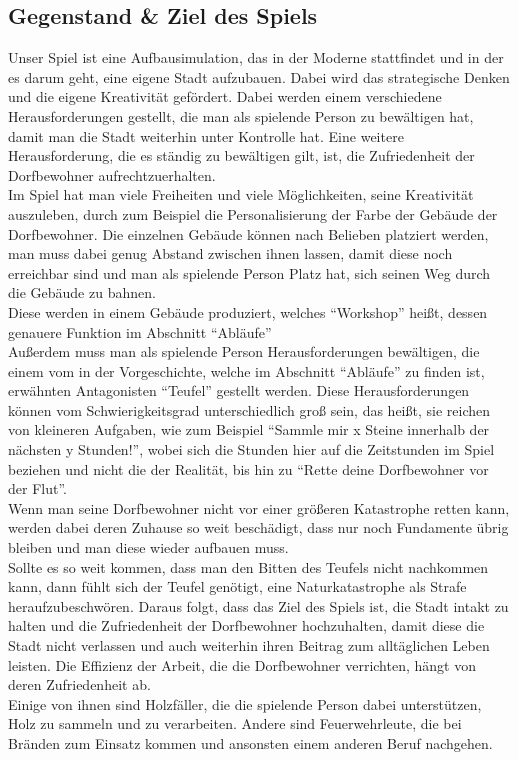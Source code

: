 \documentclass[paper=A4,pagesize=auto,12pt,headinclude=true,footinclude=true,BCOR=0mm,DIV=calc]{scrartcl}
\newcommand{\sectionspace}{
	\vspace{0.5cm}
}
\begin{document}
\sectionspace
\subsection{Gegenstand \& Ziel des Spiels}\label{sec:Gegenstand}
Unser Spiel ist eine Aufbausimulation, das in der Moderne stattfindet und in der es darum geht, eine eigene Stadt aufzubauen. Dabei wird das strategische Denken und die eigene Kreativität gefördert. Dabei werden einem verschiedene Herausforderungen gestellt, die man als spielende Person zu bewältigen hat, damit man die Stadt weiterhin unter Kontrolle hat. Eine weitere Herausforderung, die es ständig zu bewältigen gilt, ist, die Zufriedenheit der Dorfbewohner aufrechtzuerhalten. \\
Im Spiel hat man viele Freiheiten und viele Möglichkeiten, seine Kreativität auszuleben, durch zum Beispiel die Personalisierung der Farbe der Gebäude der Dorfbewohner. Die einzelnen Gebäude können nach Belieben platziert werden, man muss dabei genug Abstand zwischen ihnen lassen, damit diese noch erreichbar sind und man als spielende Person Platz hat, sich seinen Weg durch die Gebäude zu bahnen. \\
Diese werden in einem Gebäude produziert, welches "`Workshop"' heißt, dessen genauere Funktion im Abschnitt "`Abläufe"' \\
Außerdem muss man als spielende Person Herausforderungen bewältigen, die einem vom in der Vorgeschichte, welche im Abschnitt "`Abläufe"' zu finden ist, erwähnten Antagonisten "`Teufel"' gestellt werden. Diese Herausforderungen können vom Schwierigkeitsgrad unterschiedlich groß sein, das heißt, sie reichen von kleineren Aufgaben, wie zum Beispiel "`Sammle mir x Steine innerhalb der nächsten y Stunden!"', wobei sich die Stunden hier auf die Zeitstunden im Spiel beziehen und nicht die der Realität, bis hin zu "`Rette deine Dorfbewohner vor der Flut"'. \\
Wenn man seine Dorfbewohner nicht vor einer größeren Katastrophe retten kann, werden dabei deren Zuhause so weit beschädigt, dass nur noch Fundamente übrig bleiben und man diese wieder aufbauen muss. \\
Sollte es so weit kommen, dass man den Bitten des Teufels nicht nachkommen kann, dann fühlt sich der Teufel genötigt, eine Naturkatastrophe als Strafe heraufzubeschwören.
Daraus folgt, dass das Ziel des Spiels ist, die Stadt intakt zu halten und die Zufriedenheit der Dorfbewohner hochzuhalten, damit diese die Stadt nicht verlassen und auch weiterhin ihren Beitrag zum alltäglichen Leben leisten. Die Effizienz der Arbeit, die die Dorfbewohner verrichten, hängt von deren Zufriedenheit ab. \\
Einige von ihnen sind Holzfäller, die die spielende Person dabei unterstützen, Holz zu sammeln und zu verarbeiten. Andere sind Feuerwehrleute, die bei Bränden zum Einsatz kommen und ansonsten einem anderen Beruf nachgehen.
\end{document}
